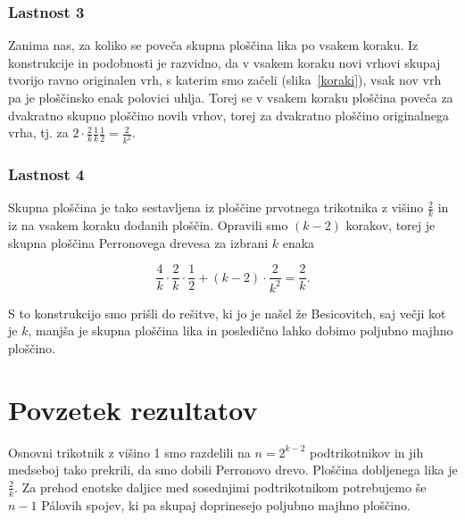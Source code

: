 \documentclass[a4paper, 12pt]{article}
\begin{document}

\subsubsection*{Lastnost 3}

Zanima nas, za koliko se poveča skupna ploščina lika po vsakem koraku. Iz konstrukcije in podobnosti je razvidno, da v vsakem koraku novi vrhovi skupaj tvorijo ravno originalen vrh, s katerim smo začeli (slika~\ref{koraki}), vsak nov vrh pa je ploščinsko enak polovici uhlja. Torej se v vsakem koraku ploščina poveča za dvakratno  skupno ploščino novih vrhov, torej za dvakratno ploščino originalnega vrha, tj. za $ 2 \cdot \frac{2}{k} \frac{1}{k} \frac{1}{2} = \frac{2}{k^2} $.


\subsubsection*{Lastnost 4}

Skupna ploščina je tako sestavljena iz ploščine prvotnega trikotnika z višino $ \frac{2}{k} $ in iz na vsakem koraku dodanih ploščin. Opravili smo $ (k-2) $ korakov, torej je skupna ploščina Perronovega drevesa za izbrani $ k $ enaka

\begin{equation*}
    \frac{4}{k} \cdot \frac{2}{k} \cdot \frac{1}{2} + (k -2) \cdot \frac{2}{k^2} = \frac{2}{k}.
\end{equation*}

S to konstrukcijo smo prišli do rešitve, ki jo je našel že Besicovitch, saj večji kot je $ k $, manjša je skupna ploščina lika in posledično lahko dobimo poljubno majhno ploščino.



\newpage

\section*{Povzetek rezultatov}

Osnovni trikotnik z višino 1 smo razdelili na $ n = 2^{k-2} $ podtrikotnikov in jih medseboj tako prekrili, da smo dobili Perronovo drevo. Ploščina dobljenega lika je $ \frac{2}{k} $. Za prehod enotske daljice med sosednjimi podtrikotnikom potrebujemo še $ n-1 $ Pálovih spojev, ki pa skupaj doprinesejo poljubno majhno ploščino.
\end{document}

